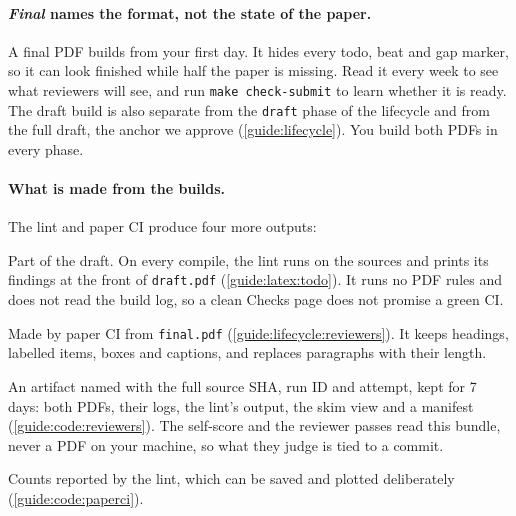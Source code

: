 \paragraph{\emph{Final} names the format, not the state of the paper.} A final PDF builds from your first day. It hides every todo, beat and gap marker, so it can look finished while half the paper is missing. Read it every week to see what reviewers will see, and run \texttt{make check-submit} to learn whether it is ready. The draft build is also separate from the \texttt{draft} phase of the lifecycle and from the full draft, the anchor we approve (\cref{guide:lifecycle}). You build both PDFs in every phase.

\paragraph{What is made from the builds.} The lint and paper CI produce four more outputs:
\begin{description}[noitemsep]
  \item[Checks page] Part of the draft. On every compile, the lint runs on the sources and prints its findings at the front of \texttt{draft.pdf} (\cref{guide:latex:todo}). It runs no PDF rules and does not read the build log, so a clean Checks page does not promise a green CI.
  \item[Skim view] Made by paper CI from \texttt{final.pdf} (\cref{guide:lifecycle:reviewers}). It keeps headings, labelled items, boxes and captions, and replaces paragraphs with their length.
  \item[Review bundle] An artifact named with the full source SHA, run ID and attempt, kept for 7 days: both PDFs, their logs, the lint's output, the skim view and a manifest (\cref{guide:code:reviewers}). The self-score and the reviewer passes read this bundle, never a PDF on your machine, so what they judge is tied to a commit.
  \item[Burn-down counts] Counts reported by the lint, which can be saved and plotted deliberately (\cref{guide:code:paperci}).
\end{description}


